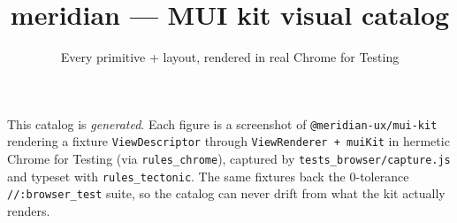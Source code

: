 \documentclass[10pt]{article}
\title{\textbf{meridian} — MUI kit visual catalog}
\author{Every primitive + layout, rendered in real Chrome for Testing}
\date{}
\begin{document}
\maketitle

\noindent
This catalog is \emph{generated}. Each figure is a screenshot of
\texttt{@meridian-ux/mui-kit} rendering a fixture \texttt{ViewDescriptor}
through \texttt{ViewRenderer + muiKit} in hermetic Chrome for Testing (via
\texttt{rules\_chrome}), captured by \texttt{tests\_browser/capture.js} and
typeset with \texttt{rules\_tectonic}. The same fixtures back the 0-tolerance
\texttt{//:browser\_test} suite, so the catalog can never drift from what the kit
actually renders.

\vspace{1em}
\tableofcontents
\clearpage


\end{document}
